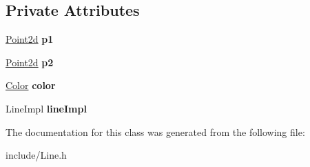 \subsection*{Private Attributes}
\begin{DoxyCompactItemize}
\item 
\mbox{\label{classtiara_1_1Line_ad3ad492dc1367b18ef3520b713a61c49}} 
\mbox{\hyperlink{classtiara_1_1Point2d}{Point2d}} {\bfseries p1}
\item 
\mbox{\label{classtiara_1_1Line_a5c0165f9f7c6becb5a593e0f9fe0d743}} 
\mbox{\hyperlink{classtiara_1_1Point2d}{Point2d}} {\bfseries p2}
\item 
\mbox{\label{classtiara_1_1Line_a86e24c74db5e4313c46968a818b7ccd3}} 
\mbox{\hyperlink{classtiara_1_1Color}{Color}} {\bfseries color}
\item 
\mbox{\label{classtiara_1_1Line_a21e552846e046787eb5d3d81e5700826}} 
Line\+Impl {\bfseries line\+Impl}
\end{DoxyCompactItemize}


The documentation for this class was generated from the following file\+:\begin{DoxyCompactItemize}
\item 
include/Line.\+h\end{DoxyCompactItemize}
